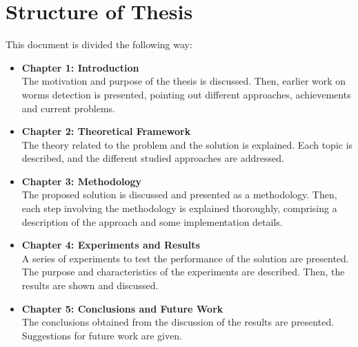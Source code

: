 \section{Structure of Thesis}
This document is divided the following way:
\begin{itemize}
\item \textbf{Chapter 1: Introduction}\\
  The motivation and purpose of the thesis is discussed. Then, earlier work
  on worms detection is presented, pointing out different approaches, achievements
  and current problems.
\item \textbf{Chapter 2: Theoretical Framework}\\
  The theory related to the problem and the solution is explained. Each topic is described,
  and the different studied approaches are addressed.
\item \textbf{Chapter 3: Methodology}\\
  The proposed solution is discussed and presented as a methodology. Then, each step 
  involving the methodology is explained thoroughly, comprising a description of the 
  approach and some implementation details.
\item \textbf{Chapter 4: Experiments and Results}\\
  A series of experiments to test the performance of the solution are presented. 
  The purpose and characteristics of the experiments are described. Then, the results are shown and discussed.
\item \textbf{Chapter 5: Conclusions and Future Work}\\
  The conclusions obtained from the discussion of the results are presented. 
Suggestions for future work are given.
\end{itemize}
